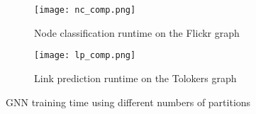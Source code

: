 \documentclass[acmsmall,nonacm,screen,review]{acmart}
\begin{document}
\begin{figure}[bt!]
     \centering
     \begin{subfigure}[b]{0.45\textwidth}
         \centering
         \texttt{[image: nc\_comp.png]}
         \caption{Node classification runtime on the Flickr graph}
         \label{nc_comp}
     \end{subfigure}
     \hfill
     \begin{subfigure}[b]{0.45\textwidth}
         \centering
         \texttt{[image: lp\_comp.png]}
         \caption{Link prediction runtime on the Tolokers graph}
         \label{lp_comp}
     \end{subfigure}
     \caption{GNN training time using different numbers of partitions}
     \label{parts}
\end{figure}
\end{document}
